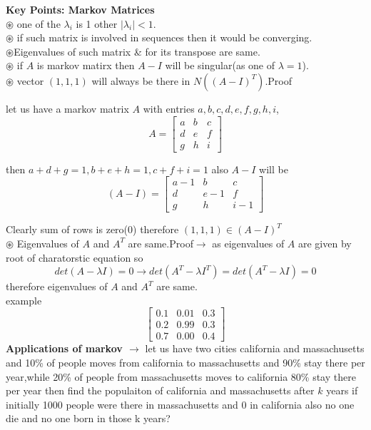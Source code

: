 \documentclass[a4paper,11pt]{article}
\numberwithin{equation}{section}
\begin{document}
\begin{itemize}
\textbf{Key Points: Markov Matrices}\\

$\circledast$ one of the $\lambda_i$ is 1 other $|\lambda_i|$$<1$.\\
$\circledast$ if such matrix is involved in sequences then it would be converging.\\
$\circledast$Eigenvalues of such matrix \& for its transpose are same.\\
$\circledast$ if $A$ is markov matirx then $A-I$ will be singular(as one of $\lambda=1$).\\
$\circledast$ vector $(1,1,1)$ will always be there in $N((A-I)^T)$.Proof
\begin{center}
    let us have a markov matrix $A$ with entries $a,b,c,d,e,f,g,h,i$,
    \[A=
    \begin{bmatrix}
        a&b&c\\d&e&f\\g&h&i
    \end{bmatrix}
    \]
\end{center}
\begin{center}
    then $a+d+g=1,b+e+h=1,c+f+i=1$ also $A-I$ will be
    \[(A-I)=
    \begin{bmatrix}
        a-1&b&c\\d&e-1&f\\g&h&i-1
    \end{bmatrix}
    \]
\end{center}
Clearly sum of rows is zero($0$) therefore $(1,1,1)\in(A-I)^T$\\

$\circledast$ Eigenvalues of $A$ and $A^T$ are same.Proof$\rightarrow$ as eigenvalues of $A$ are given by root of charatorstic equation so
\[
det(A-\lambda I)=0 \rightarrow det(A^T-\lambda I^T)=det(A^T-\lambda I)=0
\]
therefore eigenvalues of $A$ and $A^T$ are same.\\

example
\[
\begin{bmatrix}
    0.1&0.01&0.3\\0.2&0.99&0.3\\0.7&0.00&0.4
\end{bmatrix}
\]
\textbf{Applications of markov $\rightarrow$} let us have two cities california and massachusetts and 10\% of people moves from california to massachusetts and 90\% stay there per year,while 20\% of people from massachusetts moves to california 80\% stay there per year then find the populaiton of california and massachusetts after $k$ years if initially 1000 people were there in massachusetts and 0 in california also no one die and no one born in those k years?


\end{itemize}
\end{document}
